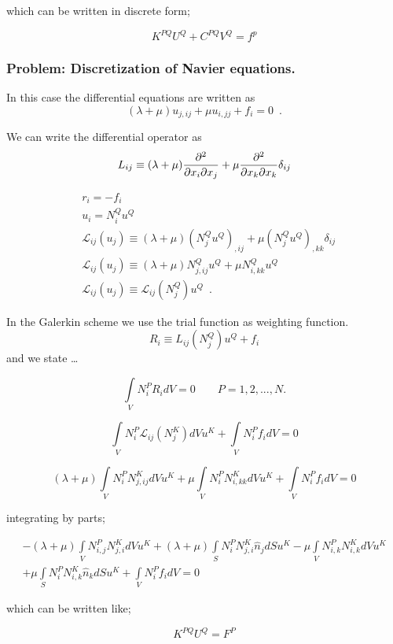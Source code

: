 which can be written in discrete form;

\[{K^{PQ}}{U^Q} + {C^{PQ}}{V^Q} = {f^p}\]



\subsubsection*{Problem: Discretization of Navier equations.}
In this case the differential equations are written as
\[(\lambda  + \mu ){u_{j,ij}} + \mu {u_{i,jj}} + {f_i} = 0 \enspace .\]

We can write the differential operator as
\[L_{ij} \equiv (\lambda  + \mu )\pdv[2]{}{x_i}{x_j} + \mu \pdv[2]{}{x_k}{x_k}\delta_{ij}\]

\begin{align*}
&r_i =  - f_i\\
&u_i = N_i^Q u^Q\\
&\mathcal{L}_{ij}(u_j) \equiv (\lambda  + \mu )(N_j^Q{u^Q})_{,ij} + \mu (N_j^Q{u^Q})_{,kk}\delta_{ij}\\
&\mathcal{L}_{ij}(u_j) \equiv (\lambda  + \mu )N_{j,ij}^Q u^Q + \mu N_{i,kk}^Q u^Q\\
&\mathcal{L}_{ij}(u_j) \equiv \mathcal{L}_{ij}(N_j^Q) u^Q \enspace .
\end{align*}

In the Galerkin scheme we use the trial function as weighting function.
\[R_i \equiv L_{ij}(N_j^Q) u^Q + f_i\]
and we state \dots

\[\int\limits_V {N_i^P{R_i}dV = 0} \quad \quad P=1,2,...,N. \]

\[\int\limits_V {N_i^P{\mathcal{L}_{ij}}(N_j^K)dV{u^K}}  + \int\limits_V {N_i^P{f_i}dV = 0} \]

\[(\lambda  + \mu )\int\limits_V {N_i^PN_{j,ij}^KdV{u^K}}  + \mu \int\limits_V {N_i^PN_{i,kk}^KdV{u^K}}  + \int\limits_V {N_i^P{f_i}dV = 0} \]

integrating by parts;

\begin{align*}
- (\lambda  + \mu )\int\limits_V {N_{i,j}^PN_{j,i}^KdV{u^K} + (\lambda  + \mu )\int\limits_S {N_i^PN_{j,i}^K{{\hat n}_j}dS{u^K} - \mu \int\limits_V {N_{i,k}^PN_{i,k}^KdV{u^K}} } } \\
+ \mu \int\limits_S {N_i^PN_{i,k}^K{{\hat n}_k}dS{u^K}}  + \int\limits_V {N_i^P{f_i}dV = 0}
\end{align*}

which can be written like;


\[{K^{PQ}}{U^Q} = {F^P}\]

